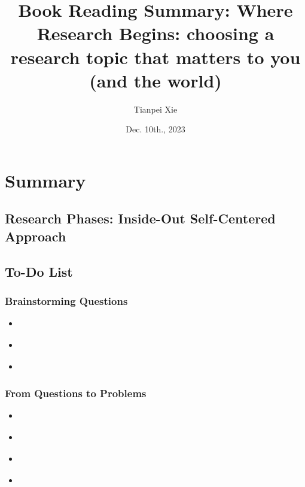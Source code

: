 \documentclass[11pt]{article}
\begin{document}
\title{Book Reading Summary: Where Research Begins: choosing a research topic that matters to you (and the world)}
\author{ Tianpei Xie}
\date{Dec. 10th., 2023}
\maketitle
\tableofcontents
\newpage
\section{Summary}
\subsection{Research Phases: Inside-Out Self-Centered Approach}
\subsection{To-Do List}
\subsubsection{Brainstorming Questions}
\begin{itemize}
\item \begin{exercise}
\end{exercise}

\item \begin{exercise}
\end{exercise}

\item \begin{exercise}
\end{exercise}
\end{itemize}
\subsubsection{From Questions to Problems}
\begin{itemize}
\item \begin{exercise}
\end{exercise}

\item \begin{exercise}
\end{exercise}

\item \begin{exercise}
\end{exercise}

\item \begin{exercise}
\end{exercise}
\end{itemize}
\end{document}
